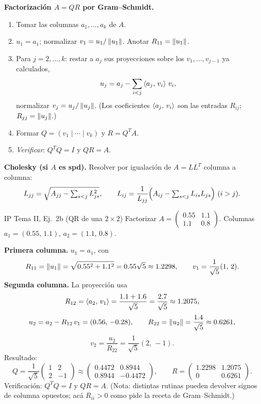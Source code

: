 \begin{receta}
\textbf{Factorización $A = QR$ por Gram--Schmidt.}
\begin{enumerate}
\item Tomar las columnas $a_1, \dots, a_k$ de $A$.
\item $u_1 = a_1$; normalizar $v_1 = u_1/\left\lVert u_1 \right\rVert$. Anotar $R_{11} = \left\lVert u_1 \right\rVert$.
\item Para $j = 2, \dots, k$: restar a $a_j$ sus proyecciones sobre los $v_1,\dots,v_{j-1}$ ya calculados,
  \[
  u_j = a_j - \sum_{i<j} \left\langle a_j,\, v_i \right\rangle\, v_i,
  \]
  normalizar $v_j = u_j/\left\lVert u_j \right\rVert$. (Los coeficientes $\left\langle a_j,\, v_i \right\rangle$ son las entradas $R_{ij}$; $R_{jj} = \left\lVert u_j \right\rVert$.)
\item Formar $Q = (v_1 \mid \cdots \mid v_k)$ y $R = Q^T A$.
\item \emph{Verificar}: $Q^T Q = I$ y $QR = A$.
\end{enumerate}

\textbf{Cholesky (si $A$ es spd).} Resolver por igualación de $A = LL^T$ columna a columna:
\[
L_{jj} = \sqrt{A_{jj} - \textstyle\sum_{s<j} L_{js}^2}, \qquad
L_{ij} = \frac{1}{L_{jj}}\Bigl(A_{ij} - \textstyle\sum_{s<j} L_{is} L_{js}\Bigr)\ (i>j).
\]
\end{receta}

\begin{ejemplo}{IP Tema II, Ej.\ 2b (QR de una $2\times 2$)}
Factorizar $A = \begin{pmatrix} 0.55 & 1.1 \\ 1.1 & 0.8 \end{pmatrix}$. Columnas $a_1 = (0.55,\,1.1)$, $a_2 = (1.1,\,0.8)$.

\textbf{Primera columna.} $u_1 = a_1$, con
\[
R_{11} = \left\lVert u_1 \right\rVert = \sqrt{0.55^2 + 1.1^2} = 0.55\sqrt{5} \approx 1.2298, \qquad v_1 = \frac{1}{\sqrt{5}}(1,\,2).
\]
\textbf{Segunda columna.} La proyección usa
\[
R_{12} = \left\langle a_2,\, v_1 \right\rangle = \frac{1.1 + 1.6}{\sqrt{5}} = \frac{2.7}{\sqrt{5}} \approx 1.2075,
\]
\[
u_2 = a_2 - R_{12}\, v_1 = (0.56,\,-0.28), \qquad R_{22} = \left\lVert u_2 \right\rVert = \frac{1.4}{\sqrt{5}} \approx 0.6261,
\]
\[
v_2 = \frac{u_2}{R_{22}} = \frac{1}{\sqrt{5}}(2,\,-1).
\]
Resultado:
\[
Q = \frac{1}{\sqrt{5}}\begin{pmatrix} 1 & 2 \\ 2 & -1 \end{pmatrix} \approx \begin{pmatrix} 0.4472 & 0.8944 \\ 0.8944 & -0.4472 \end{pmatrix}, \qquad R = \begin{pmatrix} 1.2298 & 1.2075 \\ 0 & 0.6261 \end{pmatrix}.
\]
Verificación: $Q^T Q = I$ y $QR = A$. (Nota: distintas rutinas pueden devolver signos de columna opuestos; acá $R_{ii} > 0$ como pide la receta de Gram--Schmidt.)
\end{ejemplo}

